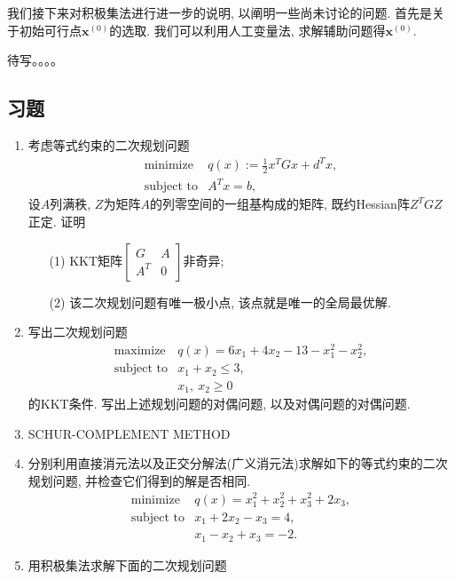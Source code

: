 \documentclass{SBCbookchapter}
\newcommand{\V}[1]{{\bm{#1}}}
\numberwithin{equation}{section}
\begin{document}
我们接下来对积极集法进行进一步的说明, 以阐明一些尚未讨论的问题. 首先是关于初始可行点$\V{x}^{(0)}$的选取. 我们可以利用人工变量法, 求解辅助问题得$\V{x}^{(0)}.$

待写。。。。

\subsection*{习题}

\begin{enumerate}
\item 考虑等式约束的二次规划问题
\begin{equation*}
\begin{array}{cl}
\text{minimize} & q(x) := \frac{1}{2} x^T G x + d^T x, \\
\text{subject to} & A^T x = b,
\end{array}
\end{equation*}
设$A$列满秩, $Z$为矩阵$A$的列零空间的一组基构成的矩阵, 既约Hessian阵$Z^T G Z$正定. 证明
\begin{itemize}
    \item[(1)] KKT矩阵$\begin{bmatrix} G & A \\ A^T & 0 \end{bmatrix}$非奇异;
    \item[(2)] 该二次规划问题有唯一极小点, 该点就是唯一的全局最优解.
\end{itemize}

\item 写出二次规划问题
\begin{equation*}
\begin{array}{cl}
\text{maximize} & q(x) = 6x_1 + 4x_2 - 13 - x_1^2 - x_2^2, \\
\text{subject to} & x_1 + x_2 \leqslant 3, \\
& x_1, ~ x_2 \geqslant 0
\end{array}
\end{equation*}
的KKT条件. 写出上述规划问题的对偶问题, 以及对偶问题的对偶问题.

\item SCHUR-COMPLEMENT METHOD

\item 分别利用直接消元法以及正交分解法(广义消元法)求解如下的等式约束的二次规划问题, 并检查它们得到的解是否相同.
\begin{equation*}
\begin{array}{cl}
\text{minimize} & q(x) = x_1^2 + x_2^2 + x_3^2 + 2x_3, \\
\text{subject to} & x_1 + 2x_2 - x_3 = 4, \\
& x_1 - x_2 + x_3 = -2.
\end{array}
\end{equation*}

\item 用积极集法求解下面的二次规划问题
\end{enumerate}



\end{document}
